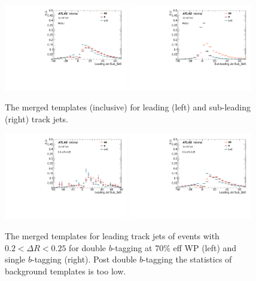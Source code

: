 \begin{figure}[htbp]
  \centering
 \includegraphics[width=0.48\textwidth]{figures/gbb/Sub_Sd0_Fits/Canv_FitTemplate_Inclusive_x.pdf}
 \includegraphics[width=0.48\textwidth]{figures/gbb/Sub_Sd0_Fits/Canv_FitTemplate_Inclusive_y.pdf}\\
\caption{The merged \subsdzero templates (inclusive) for leading (left) and sub-leading (right) track jets.}
  \label{fig:gbb-templates}
\end{figure}


\begin{figure}[htbp]
  \centering
 \includegraphics[width=0.48\textwidth]{figures/gbb/Canv_FitTemplate_medium.pdf}
 \includegraphics[width=0.48\textwidth]{figures/gbb/Sub_Sd0_Fits/Canv_FitTemplate_02-DeltaR-025_LpT_INF_SpT_INF_x.pdf}\\
\caption{The merged \subsdzero templates for leading track jets of events with $0.2<\Delta R<0.25$ for double $b$-tagging at 70\% eff WP (left) and single $b$-tagging (right). Post double $b$-tagging the statistics of background templates is too low.}
 \label{fig:gbb-template-leadtight-medium}
\end{figure}


